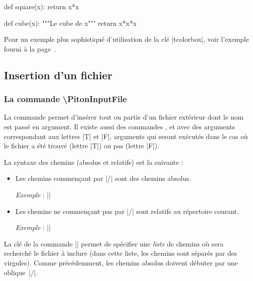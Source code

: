 \documentclass[dvipsnames,svgnames]{article}
\begin{document}
\begin{center}
%
\begin{Piton}
def square(x):
    return x*x
\end{Piton}
\hspace{1cm}
\begin{Piton}
def cube(x):
    """Le cube de x"""
    return x*x*x
\end{Piton}
\end{center}

\bigskip
Pour  un exemple plus sophistiqué d'utilisation de la clé |tcolorbox|, voir l'exemple fourni
à la page~\pageref{examples-tcolorbox}.


\subsection{Insertion d'un fichier}

\label{PitonInputFile}

\subsubsection{La commande \textbackslash PitonInputFile}


La commande  permet d'insérer tout ou partie d'un
fichier extérieur dont le nom est passé en argument. Il existe aussi des commandes
,  et
 avec des arguments correspondant aux lettres |T| et
|F|, arguments qui seront exécutés dans le cas où le fichier a été trouvé (lettre |T|) ou
pas (lettre |F|).

\smallskip
La syntaxe des chemins (absolus et relatifs) est la suivante : 
\begin{itemize}
\item Les chemins commençant par |/| sont des chemins absolus.

\emph{Exemple} : ||

\item Les chemins ne commençant pas par |/| sont relatifs au répertoire courant.

\emph{Exemple} : ||
\end{itemize}


La clé  de la commande |\PitonOptions| permet de spécifier une
\emph{liste} de chemins où sera recherché le fichier à inclure (dans cette liste, les
chemins sont séparés par des virgules). Comme précédemment, les chemins absolus doivent
débuter par une oblique~|/|.
\end{document}
